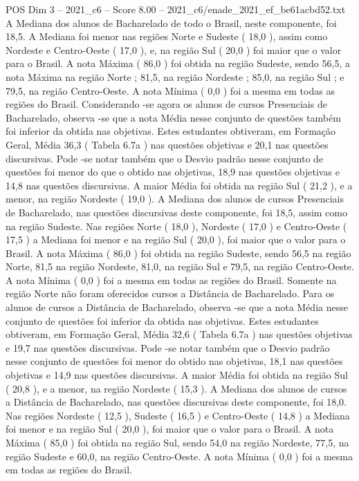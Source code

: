\begin{textsample}{POS Dim 3 – 2021\_c6 – Score 8.00 – 2021\_c6/enade\_2021\_ef\_be61acbd52.txt}
A Mediana dos alunos de Bacharelado de todo o Brasil, neste componente, foi 18,5.
A Mediana foi menor nas regiões Norte e Sudeste ( 18,0 ), assim como Nordeste e Centro-Oeste ( 17,0 ), e, na região Sul ( 20,0 ) foi maior que o valor para o Brasil.
A nota Máxima ( 86,0 ) foi obtida na região Sudeste, sendo 56,5, a nota Máxima na região Norte ; 81,5, na região Nordeste ; 85,0, na região Sul ; e 79,5, na região Centro-Oeste.
A nota Mínima ( 0,0 ) foi a mesma em todas as regiões do Brasil.
Considerando -se agora os alunos de cursos Presenciais de Bacharelado, observa -se que a nota Média nesse conjunto de questões também foi inferior da obtida nas objetivas.
Estes estudantes obtiveram, em Formação Geral, Média 36,3 ( Tabela 6.7a ) nas questões objetivas e 20,1 nas questões discursivas.
Pode -se notar também que o Desvio padrão nesse conjunto de questões foi menor do que o obtido nas objetivas, 18,9 nas questões objetivas e 14,8 nas questões discursivas.
A maior Média foi obtida na região Sul ( 21,2 ), e a menor, na região Nordeste ( 19,0 ).
A Mediana dos alunos de cursos Presenciais de Bacharelado, nas questões discursivas deste componente, foi 18,5, assim como na região Sudeste.
Nas regiões Norte ( 18,0 ), Nordeste ( 17,0 ) e Centro-Oeste ( 17,5 ) a Mediana foi menor e na região Sul ( 20,0 ), foi maior que o valor para o Brasil.
A nota Máxima ( 86,0 ) foi obtida na região Sudeste, sendo 56,5 na região Norte, 81,5 na região Nordeste, 81,0, na região Sul e 79,5, na região Centro-Oeste.
A nota Mínima ( 0,0 ) foi a mesma em todas as regiões do Brasil.
Somente na região Norte não foram oferecidos cursos a Distância de Bacharelado.
Para os alunos de cursos a Distância de Bacharelado, observa -se que a nota Média nesse conjunto de questões foi inferior da obtida nas objetivas.
Estes estudantes obtiveram, em Formação Geral, Média 32,6 ( Tabela 6.7a ) nas questões objetivas e 19,7 nas questões discursivas.
Pode -se notar também que o Desvio padrão nesse conjunto de questões foi menor do obtido nas objetivas, 18,1 nas questões objetivas e 14,9 nas questões discursivas.
A maior Média foi obtida na região Sul ( 20,8 ), e a menor, na região Nordeste ( 15,3 ).
A Mediana dos alunos de cursos a Distância de Bacharelado, nas questões discursivas deste componente, foi 18,0.
Nas regiões Nordeste ( 12,5 ), Sudeste ( 16,5 ) e Centro-Oeste ( 14,8 ) a Mediana foi menor e na região Sul ( 20,0 ), foi maior que o valor para o Brasil.
A nota Máxima ( 85,0 ) foi obtida na região Sul, sendo 54,0 na região Nordeste, 77,5, na região Sudeste e 60,0, na região Centro-Oeste.
A nota Mínima ( 0,0 ) foi a mesma em todas as regiões do Brasil.

\end{textsample}
